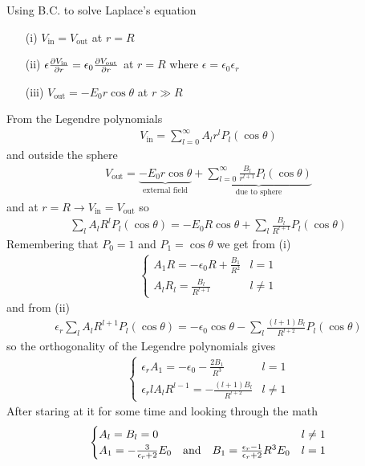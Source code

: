 \documentclass[../main.tex]{subfiles}
\begin{document}
Using B.C. to solve Laplace's equation
\begin{itemize}
    \item [(i)] $V_\text{in} = V_\text{out}$ at $r = R$
    \item [(ii)] $\epsilon \pdv{V_\text{in}}{r} = \epsilon_0 \pdv{V_\text{out}}{r}$ at $r = R$ where $\epsilon = \epsilon_0 \epsilon_r$
    \item [(iii)] $V_\text{out} = -E_0 r\cos\theta$ at $r \gg R$
\end{itemize}

From the Legendre polynomials
\begin{align*}
    V_\text{in} = \sum_{l = 0}^\infty A_l r^l P_l(\cos\theta)
\end{align*}
and outside the sphere
\begin{align*}
    V_\text{out} = \underbrace{-E_0 r \cos\theta}_\text{external field} + \underbrace{\sum_{l = 0}^\infty \frac{B_l}{r^{l + 1}} P_l(\cos\theta)}_\text{due to sphere} 
\end{align*}
and at $r = R \to V_\text{in} = V_\text{out}$ so
\begin{align*}
    \sum_l A_l R^l P_l(\cos\theta) = -E_0 R \cos\theta + \sum_l \frac{B_l}{R^{l + 1}} P_l(\cos\theta)
\end{align*}
Remembering that $P_0 = 1$ and $P_1 = \cos\theta$ we get from (i)
\begin{align*}
    \begin{cases}
        A_1 R = -\epsilon_0 R + \frac{B_1}{R^2} & l = 1 \\
        A_l R_l = \frac{B_l}{R^{l + 1}} & l \neq 1
    \end{cases}
\end{align*}
and from (ii) 
\begin{align*}
    \epsilon_r \sum_l A_l R^{l + 1} P_l (\cos\theta) = -\epsilon_0 \cos\theta
        - \sum_l \frac{(l + 1)B_l}{R^{l + 2}} P_l(\cos\theta)
\end{align*}
so the orthogonality of the Legendre polynomials gives
\begin{align*}
    \begin{cases}
        \epsilon_r A_1 = -\epsilon_0 - \frac{2B_1}{R^3} & l = 1 \\
        \epsilon_r l A_l R^{l - 1} = - \frac{(l + 1)B_l}{R^{l + 2}} & l \neq 1
    \end{cases}
\end{align*}
After staring at it for some time and looking through the math
\begin{align*}
    \begin{cases}
        A_l = B_l = 0 & l \neq 1 \\
        A_1 = -\frac{3}{\epsilon_r + 2} E_0 \qand B_1 = \frac{\epsilon_r - 1}{\epsilon_r + 2} R^3 E_0 & l = 1
    \end{cases}
\end{align*}
\end{document}
